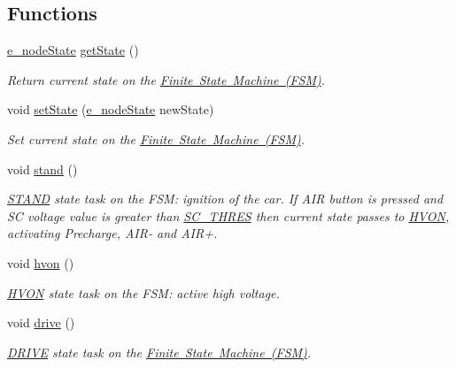 \subsection*{Functions}
\begin{DoxyCompactItemize}
\item 
\mbox{\hyperlink{group__stages__group_ga29e04432d3efcac24a5ae62572a6e8f2}{e\+\_\+node\+State}} \mbox{\hyperlink{group__stages__group_ga2802a8c3f0174f4e54dd2381968212a0}{get\+State}} ()
\begin{DoxyCompactList}\small\item\em Return current state on the \mbox{\hyperlink{_f_s_m_page}{Finite State Machine (F\+SM)}}. \end{DoxyCompactList}\item 
void \mbox{\hyperlink{group__stages__group_ga47cb7615bbcf2c96cc4a7656f9a76bab}{set\+State}} (\mbox{\hyperlink{group__stages__group_ga29e04432d3efcac24a5ae62572a6e8f2}{e\+\_\+node\+State}} new\+State)
\begin{DoxyCompactList}\small\item\em Set current state on the \mbox{\hyperlink{_f_s_m_page}{Finite State Machine (F\+SM)}}. \end{DoxyCompactList}\item 
void \mbox{\hyperlink{group__stages__group_ga506140395cba78bffc95d77985780ca5}{stand}} ()
\begin{DoxyCompactList}\small\item\em \mbox{\hyperlink{_f_s_m_page_STAND}{S\+T\+A\+ND}} state task on the F\+SM\+: ignition of the car. If A\+IR button is pressed and SC voltage value is greater than \mbox{\hyperlink{group__stages__group_ga9688af4f17ae88b4d149269d71b7ff1f}{S\+C\+\_\+\+T\+H\+R\+ES}} then current state passes to \mbox{\hyperlink{_f_s_m_page_HVON}{H\+V\+ON}}, activating Precharge, A\+I\+R-\/ and A\+I\+R+. \end{DoxyCompactList}\item 
void \mbox{\hyperlink{group__stages__group_ga6fada8f571df828c8fe6b920e2558c37}{hvon}} ()
\begin{DoxyCompactList}\small\item\em \mbox{\hyperlink{_f_s_m_page_HVON}{H\+V\+ON}} state task on the F\+SM\+: active high voltage. \end{DoxyCompactList}\item 
void \mbox{\hyperlink{group__stages__group_ga928e32686c7e00c1ecde24c3da3019f7}{drive}} ()
\begin{DoxyCompactList}\small\item\em \mbox{\hyperlink{_f_s_m_page_DRIVE}{D\+R\+I\+VE}} state task on the \mbox{\hyperlink{_f_s_m_page}{Finite State Machine (F\+SM)}}. \end{DoxyCompactList}\item 

\end{DoxyCompactItemize}
